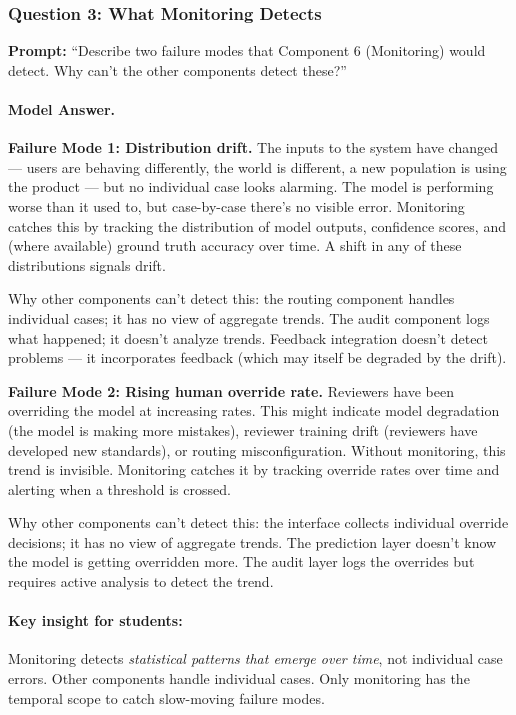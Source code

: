 \subsubsection{Question 3: What Monitoring Detects}

\textbf{Prompt:} ``Describe two failure modes that Component 6 (Monitoring) would detect. Why can't the other components detect these?''

\paragraph{Model Answer.}

\textbf{Failure Mode 1: Distribution drift.}
The inputs to the system have changed --- users are behaving differently, the world is different, a new population is using the product --- but no individual case looks alarming. The model is performing worse than it used to, but case-by-case there's no visible error. Monitoring catches this by tracking the distribution of model outputs, confidence scores, and (where available) ground truth accuracy over time. A shift in any of these distributions signals drift.

Why other components can't detect this: the routing component handles individual cases; it has no view of aggregate trends. The audit component logs what happened; it doesn't analyze trends. Feedback integration doesn't detect problems --- it incorporates feedback (which may itself be degraded by the drift).

\textbf{Failure Mode 2: Rising human override rate.}
Reviewers have been overriding the model at increasing rates. This might indicate model degradation (the model is making more mistakes), reviewer training drift (reviewers have developed new standards), or routing misconfiguration. Without monitoring, this trend is invisible. Monitoring catches it by tracking override rates over time and alerting when a threshold is crossed.

Why other components can't detect this: the interface collects individual override decisions; it has no view of aggregate trends. The prediction layer doesn't know the model is getting overridden more. The audit layer logs the overrides but requires active analysis to detect the trend.

\paragraph{Key insight for students:} Monitoring detects \emph{statistical patterns that emerge over time}, not individual case errors. Other components handle individual cases. Only monitoring has the temporal scope to catch slow-moving failure modes.

